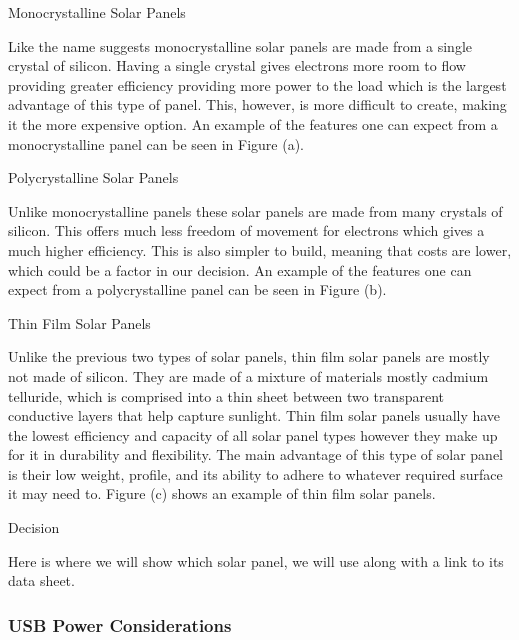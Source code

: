 Monocrystalline Solar Panels 

Like the name suggests monocrystalline solar panels are made from a single crystal of silicon. Having a single crystal gives electrons more room to flow providing greater efficiency providing more power to the load which is the largest advantage of this type of panel. This, however, is more difficult to create, making it the more expensive option. An example of the features one can expect from a monocrystalline panel can be seen in Figure (a). 

Polycrystalline Solar Panels 

Unlike monocrystalline panels these solar panels are made from many crystals of silicon. This offers much less freedom of movement for electrons which gives a much higher efficiency. This is also simpler to build, meaning that costs are lower, which could be a factor in our decision. An example of the features one can expect from a polycrystalline panel can be seen in Figure (b). 

Thin Film Solar Panels 

Unlike the previous two types of solar panels, thin film solar panels are mostly not made of silicon. They are made of a mixture of materials mostly cadmium telluride, which is comprised into a thin sheet between two transparent conductive layers that help capture sunlight. Thin film solar panels usually have the lowest efficiency and capacity of all solar panel types however they make up for it in durability and flexibility. The main advantage of this type of solar panel is their low weight, profile, and its ability to adhere to whatever required surface it may need to. Figure (c) shows an example of thin film solar panels. 

Decision 

Here is where we will show which solar panel, we will use along with a link to its data sheet. 


\subsubsection{USB Power Considerations}
